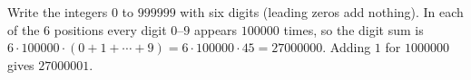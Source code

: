 Write the integers $0$ to $999999$ with six digits (leading zeros add nothing). In each of the $6$ positions every digit $0$--$9$ appears $100000$ times, so the digit sum is $6\cdot100000\cdot(0+1+\cdots+9)=6\cdot100000\cdot45=27000000$. Adding $1$ for $1000000$ gives $\boxed{27000001}$.
